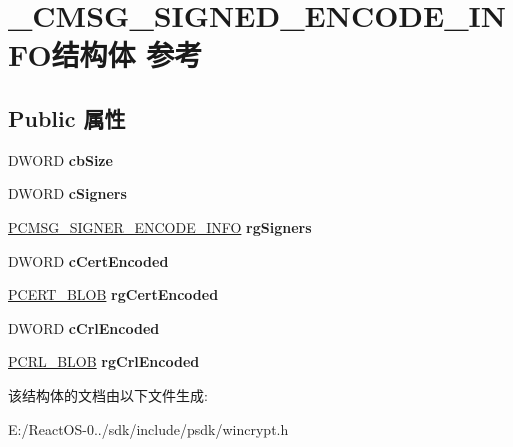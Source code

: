 \hypertarget{struct___c_m_s_g___s_i_g_n_e_d___e_n_c_o_d_e___i_n_f_o}{}\section{\+\_\+\+C\+M\+S\+G\+\_\+\+S\+I\+G\+N\+E\+D\+\_\+\+E\+N\+C\+O\+D\+E\+\_\+\+I\+N\+F\+O结构体 参考}
\label{struct___c_m_s_g___s_i_g_n_e_d___e_n_c_o_d_e___i_n_f_o}
\subsection*{Public 属性}
\begin{DoxyCompactItemize}
\item 
\mbox{\label{struct___c_m_s_g___s_i_g_n_e_d___e_n_c_o_d_e___i_n_f_o_a70dc87b5d02aafd593423c47a1ab35de}} 
D\+W\+O\+RD {\bfseries cb\+Size}
\item 
\mbox{\label{struct___c_m_s_g___s_i_g_n_e_d___e_n_c_o_d_e___i_n_f_o_a9bef6b2467d5ef364d62b3bd31f21d4d}} 
D\+W\+O\+RD {\bfseries c\+Signers}
\item 
\mbox{\label{struct___c_m_s_g___s_i_g_n_e_d___e_n_c_o_d_e___i_n_f_o_a27043429e5fde3ccf17a1c6d2322c6fc}} 
\hyperlink{struct___c_m_s_g___s_i_g_n_e_r___e_n_c_o_d_e___i_n_f_o}{P\+C\+M\+S\+G\+\_\+\+S\+I\+G\+N\+E\+R\+\_\+\+E\+N\+C\+O\+D\+E\+\_\+\+I\+N\+FO} {\bfseries rg\+Signers}
\item 
\mbox{\label{struct___c_m_s_g___s_i_g_n_e_d___e_n_c_o_d_e___i_n_f_o_a1b6fea17db42b4b8fbb593eb74cba2b2}} 
D\+W\+O\+RD {\bfseries c\+Cert\+Encoded}
\item 
\mbox{\label{struct___c_m_s_g___s_i_g_n_e_d___e_n_c_o_d_e___i_n_f_o_a4374846509494377a26cd0fff82de54b}} 
\hyperlink{struct___c_r_y_p_t_o_a_p_i___b_l_o_b}{P\+C\+E\+R\+T\+\_\+\+B\+L\+OB} {\bfseries rg\+Cert\+Encoded}
\item 
\mbox{\label{struct___c_m_s_g___s_i_g_n_e_d___e_n_c_o_d_e___i_n_f_o_a5599412386278ca202d422c5cf390a00}} 
D\+W\+O\+RD {\bfseries c\+Crl\+Encoded}
\item 
\mbox{\label{struct___c_m_s_g___s_i_g_n_e_d___e_n_c_o_d_e___i_n_f_o_a2943967466a12bf74fa68f4ff8aaf65e}} 
\hyperlink{struct___c_r_y_p_t_o_a_p_i___b_l_o_b}{P\+C\+R\+L\+\_\+\+B\+L\+OB} {\bfseries rg\+Crl\+Encoded}
\end{DoxyCompactItemize}


该结构体的文档由以下文件生成\+:\begin{DoxyCompactItemize}
\item 
E\+:/\+React\+O\+S-\/0../sdk/include/psdk/wincrypt.\+h\end{DoxyCompactItemize}

